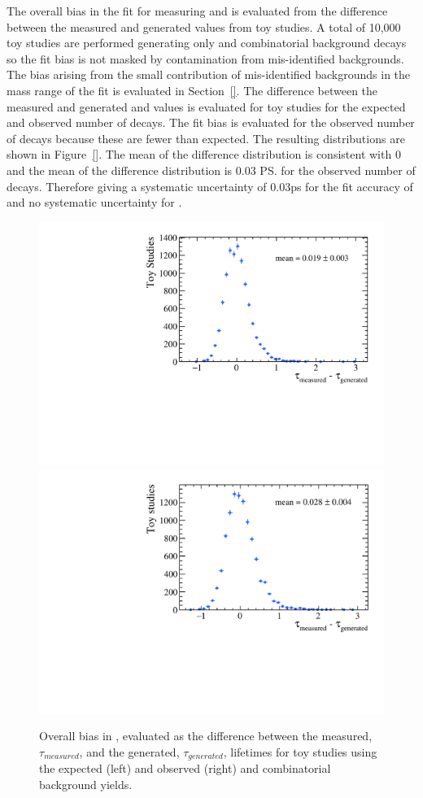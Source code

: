 The overall bias in the fit for measuring \tmumu and \Gmumu is evaluated from the difference between the measured and generated values from toy studies. A total of 10,000 toy studies are performed generating only \bsmumu and combinatorial background decays so the fit bias is not masked by contamination from mis-identified backgrounds.  The bias arising from the small contribution of mis-identified backgrounds in the mass range of the fit is evaluated in Section~\ref{}. The difference between the measured and generated \tmumu and \Gmumu values is evaluated for toy studies for the expected and observed number of \bsmumu decays. The fit bias is evaluated for the observed number of decays because these are fewer than expected. The resulting distributions are shown in Figure~\ref{}. The mean of the \Gmumu difference distribution is consistent with 0 and the mean of the \tmumu difference distribution is 0.03 \ps for the observed number of decays.  Therefore giving a systematic uncertainty of 0.03ps for the fit accuracy of \tmumu and no systematic uncertainty for \Gmumu.

\begin{figure}[htbp]
    \centering
        \includegraphics[width=0.49 \textwidth]{./Figs/LifetimeSystematics/tau_meas-tau_gen.pdf}
        \includegraphics[width=0.49 \textwidth]{./Figs/LifetimeSystematics/tau_meas-tau_gen_observed.pdf}
    \caption{Overall bias in \tmumu, evaluated as the difference between the measured, $\tau_{measured}$, and the generated, $\tau_{generated}$, lifetimes for toy studies using the expected (left) and observed (right) \bsmumu and combinatorial background yields.}
    \label{fig:BsmumuYieldPulls}
\end{figure}


